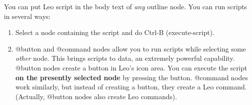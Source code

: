 \documentclass[a4paper,10pt,english]{sphinxmanual}
\begin{document}
You can put Leo script in the body text of \emph{any} outline node.  You can run
scripts in several ways:
\begin{enumerate}
\item {} 
Select a node containing the script and do Ctrl-B (execute-script).

\end{enumerate}
\begin{enumerate}
\setcounter{enumi}{1}
\item {} 
@button and @command nodes allow you to run scripts while selecting
some \emph{other} node. This brings scripts to data, an extremely powerful
capability. @button nodes create a button in Leo's icon area. You can
execute the script \textbf{on the presently selected node} by pressing the
button. @command nodes work similarly, but instead of creating a
button, they create a Leo command. (Actually, @button nodes also create
Leo commands).

\end{enumerate}
\end{document}
